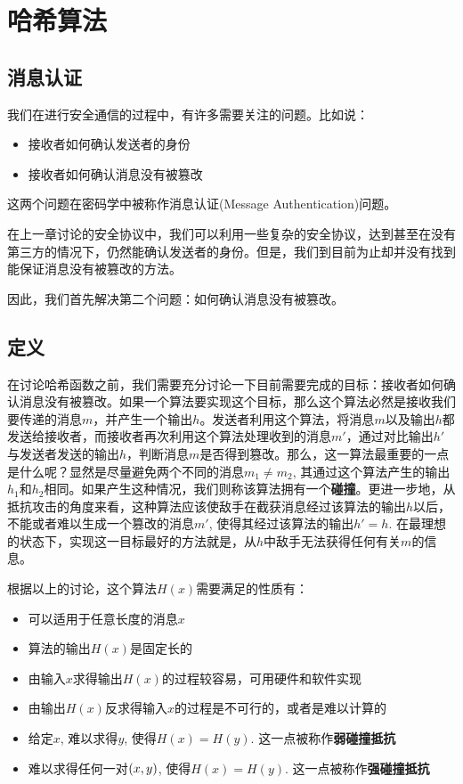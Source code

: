 \chapter{哈希算法}
\section{消息认证}
我们在进行安全通信的过程中，有许多需要关注的问题。比如说：
\begin{itemize}
	\item 接收者如何确认发送者的身份
	\item 接收者如何确认消息没有被篡改
\end{itemize}

这两个问题在密码学中被称作消息认证(Message Authentication)问题。\par
在上一章讨论的安全协议中，我们可以利用一些复杂的安全协议，达到甚至在没有第三方的情况下，仍然能确认发送者的身份。但是，我们到目前为止却并没有找到能保证消息没有被篡改的方法。\par
因此，我们首先解决第二个问题：如何确认消息没有被篡改。
\section{定义}
在讨论哈希函数之前，我们需要充分讨论一下目前需要完成的目标：接收者如何确认消息没有被篡改。如果一个算法要实现这个目标，那么这个算法必然是接收我们要传递的消息$m$，并产生一个输出$h$。发送者利用这个算法，将消息$m$以及输出$h$都发送给接收者，而接收者再次利用这个算法处理收到的消息$m'$，通过对比输出$h'$与发送者发送的输出$h$，判断消息$m$是否得到篡改。那么，这一算法最重要的一点是什么呢？显然是尽量避免两个不同的消息$m_1\neq m_2$, 其通过这个算法产生的输出$h_1$和$h_2$相同。如果产生这种情况，我们则称该算法拥有一个\textbf{碰撞}。更进一步地，从抵抗攻击的角度来看，这种算法应该使敌手在截获消息经过该算法的输出$h$以后，不能或者难以生成一个篡改的消息$m'$, 使得其经过该算法的输出$h'=h$. 在最理想的状态下，实现这一目标最好的方法就是，从$h$中敌手无法获得任何有关$m$的信息。\par
根据以上的讨论，这个算法$H(x)$需要满足的性质有：
\begin{itemize}
	\item 可以适用于任意长度的消息$x$
	\item 算法的输出$H(x)$是固定长的
	\item 由输入$x$求得输出$H(x)$的过程较容易，可用硬件和软件实现
	\item 由输出$H(x)$反求得输入$x$的过程是不可行的，或者是难以计算的
	\item 给定$x$, 难以求得$y$, 使得$H(x)=H(y)$. 这一点被称作\textbf{弱碰撞抵抗}
	\item 难以求得任何一对$\left( {x, y}\right)$, 使得$H(x)=H(y)$. 这一点被称作\textbf{强碰撞抵抗}
\end{itemize}

